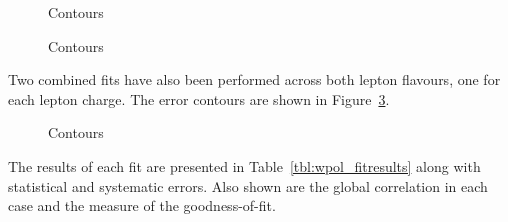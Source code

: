 \begin{figure}
\centering
{}\quad
{}
\caption{Contours}
\label{fig:wpol_contour_ele}
\end{figure}

\begin{figure}
\centering
{}\quad
{}
\caption{Contours}
\label{fig:wpol_contour_mu}
\end{figure}

Two combined fits have also been performed across both lepton flavours, one for
each lepton charge. The error contours are shown in
Figure~\ref{fig:wpol_contour_comb}.
\begin{figure}
\centering
{}\quad
{}
\caption{Contours}
\label{fig:wpol_contour_comb}
\end{figure}

The results of each fit are presented in Table~\ref{tbl:wpol_fitresults} along
with statistical and systematic errors. Also shown are the global correlation in
each case and the \chisq measure of the goodness-of-fit.

 


